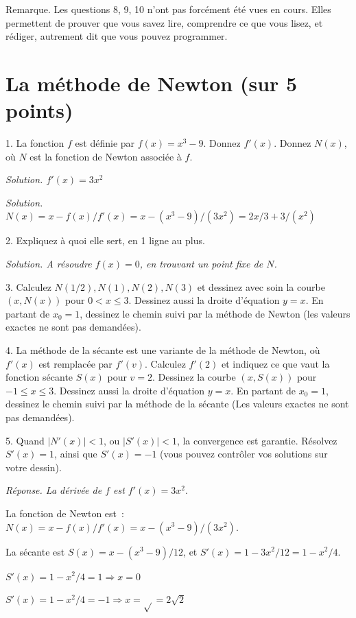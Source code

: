 \documentclass[11pt]{article}
\begin{document}
Remarque. Les questions 8, 9, 10 n'ont pas forcément été vues en cours. Elles permettent de prouver que vous savez lire, comprendre ce que vous lisez, et rédiger, autrement dit
que vous pouvez  programmer.

\else\fi




\section{La méthode de Newton (sur 5 points)}
 
1. La fonction $f$ est définie par $f(x)=x^3-9$. Donnez $f'(x)$.
Donnez  $N(x)$, où $N$ est la fonction de Newton associée à $f$.
 
\ifcorrige
{\it Solution. $f'(x)=3x^2$ }
\else\fi

\ifcorrige
{\it Solution. $N(x)=x - f(x)/f'(x)= x - (x^3-9)/(3x^2)=2x/3 + 3/(x^2)$
}
\else\fi


2. Expliquez à quoi elle sert, en 1 ligne au plus.
 
\ifcorrige
{\it Solution. A résoudre $f(x)=0$, en trouvant un point fixe de $N$.
}
\else\fi

 


3.  Calculez $N(1/2), N(1), N(2), N(3)$ et dessinez   avec soin la courbe $(x, N(x))$ pour $0 < x \le 3$.
Dessinez aussi la droite d'équation $y=x$.
En partant de $x_0=1$, dessinez 
le chemin suivi par la méthode de Newton (les valeurs exactes ne sont pas demandées).
 
4. La méthode de la sécante est une variante de la méthode de Newton, où
$f'(x)$ est remplacée par $f'(v)$. Calculez $f'(2)$ et indiquez ce 
que vaut la fonction sécante $S(x)$ pour  $v=2$. 
Dessinez  la courbe $(x, S(x))$ pour $-1 \le x \le 3$.
Dessinez  aussi la droite d'équation $y=x$.
En partant de $x_0=1$, dessinez
le chemin suivi par la méthode de la sécante
(Les valeurs exactes ne sont pas demandées).
 
5. Quand $|N'(x)|< 1$, ou $|S'(x)| < 1$, la convergence est garantie. Résolvez
$S'(x)=1$, ainsi que $S'(x)= -1$ (vous pouvez  contrôler vos solutions sur votre dessin). 


\ifcorrige
{\it Réponse. La dérivée de $f$ est $f'(x)=3x^2.$

La fonction de Newton est~: $N(x)= x - f(x)/f'(x) = x - (x^3-9)/(3x^2)$.

La sécante est $S(x)= x - (x^3-9)/12$, et $S'(x)=1-3x^2/12=1-x^2/4$.

$S'(x)=1-x^2/4=1 \Rightarrow x=0$

$S'(x)=1-x^2/4=-1  \Rightarrow x =\sqrt{}=2\sqrt{2}$

}
\else
\fi
\end{document}
